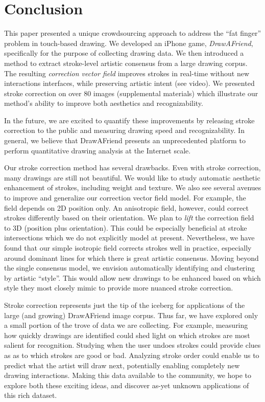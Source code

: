\section{Conclusion}

This paper presented a unique crowdsourcing approach to address the
``fat finger'' problem in touch-based drawing. We developed an
iPhone game, \emph{DrawAFriend}, specifically for the purpose of
collecting drawing data. We then introduced a method to extract
stroke-level artistic consensus from a large drawing corpus. The
resulting \emph{correction vector field} improves strokes in
real-time without new interactions interfaces, while preserving artistic
intent (see video). We presented stroke correction on over 80 images (supplemental
materials) which illustrate our method's ability to improve both
aesthetics and recognizability. 

In the future, we are excited to
quantify these improvements by releasing stroke correction to the
public and measuring drawing speed and recognizability. In general,
we believe that DrawAFriend presents an unprecedented platform to
perform quantitative drawing analysis at the Internet scale.

Our stroke correction method has several drawbacks. Even with stroke
correction, many drawings are still not beautiful. We would like to
study automatic aesthetic enhancement of strokes, including weight
and texture. We also see several avenues to improve and generalize
our correction vector field model. For example, the field depends on
2D position only. An anisotropic field, however, could correct strokes
differently based on their orientation. We plan to {\em lift} the correction field to
3D (position plus orientation). This could be especially
beneficial at stroke intersections which we do not explicitly model
at present. Nevertheless, we have found that our simple isotropic
field corrects strokes well in practice, especially
around dominant lines for which there is great artistic consensus.
Moving beyond the single consensus model, we envision automatically
identifying and clustering by artistic ``style''. This would allow new drawings to
be enhanced based on which style they most closely mimic to provide more
nuanced stroke correction.

Stroke correction represents just the tip of the iceberg for 
applications of the large (and
growing) DrawAFriend image corpus. Thus far, we have explored only a
small portion of the trove of data we are collecting. For example,
measuring how quickly drawings are identified could shed light on
which strokes are most salient for recognition. Studying when the
user undoes strokes could provide clues as as to which strokes are
good or bad. Analyzing stroke order could enable us to predict what
the artist will draw next, potentially enabling completely new
drawing interactions. Making this data available to the community,
we hope to explore both these exciting ideas, and discover as-yet
unknown applications of this rich dataset.

